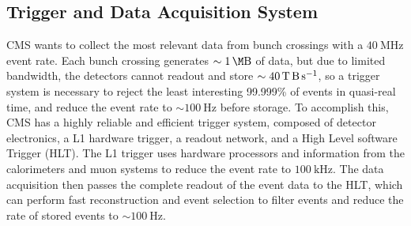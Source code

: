 \subsection{Trigger and Data Acquisition System}
CMS wants to collect the most relevant data from bunch crossings with a $\SI{40}{\MHz}$ event rate.
Each bunch crossing generates $\sim \SI{1}{\M \byte}$ of data, but due to limited bandwidth, the detectors cannot readout and store $\sim \SI{40}{\T \byte \per \s}$, so a trigger system is necessary to reject the least interesting 99.999\% of events in quasi-real time, and reduce the event rate to $\sim \SI{100}{\Hz}$ before storage.
To accomplish this, CMS has a highly reliable and efficient trigger system, composed of detector electronics, a L1 hardware trigger, a readout network, and a High Level software Trigger (HLT).
The L1 trigger uses hardware processors and information from the calorimeters and muon systems to reduce the event rate to $\SI{100}{\kHz}$.
The data acquisition then passes the complete readout of the event data to the HLT, which can perform fast reconstruction and event selection to filter events and reduce the rate of stored events to $\sim \SI{100}{\Hz}$.

